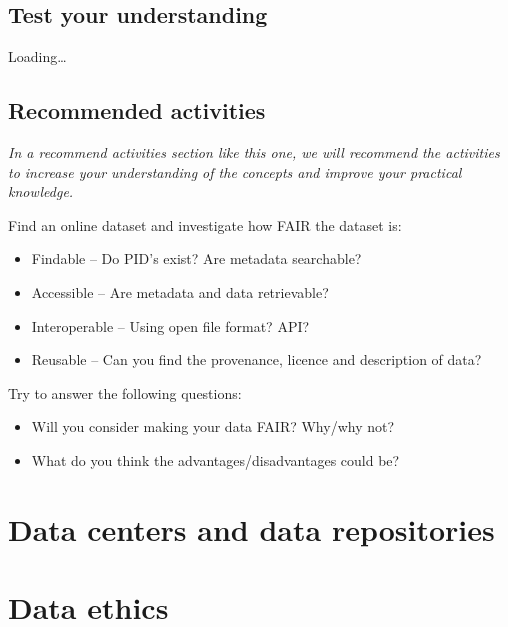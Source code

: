 \documentclass[
]{book}
\providecommand{\tightlist}{%
  \setlength{\itemsep}{0pt}\setlength{\parskip}{0pt}}
\begin{document}
\hypertarget{test-your-understanding}{%
\section{Test your understanding}\label{test-your-understanding}}

Loading\ldots{}

\hypertarget{recommended-activities}{%
\section{Recommended activities}\label{recommended-activities}}

\leavevmode{}%
\emph{In a recommend activities section like this one, we will recommend the activities to increase your understanding of the concepts and improve your practical knowledge.}

Find an online dataset and investigate how FAIR the dataset is:

\begin{itemize}
\tightlist
\item
  Findable -- Do PID's exist? Are metadata searchable?
\item
  Accessible -- Are metadata and data retrievable?
\item
  Interoperable -- Using open file format? API?
\item
  Reusable -- Can you find the provenance, licence and description of data?
\end{itemize}

Try to answer the following questions:

\begin{itemize}
\tightlist
\item
  Will you consider making your data FAIR? Why/why not?
\item
  What do you think the advantages/disadvantages could be?
\end{itemize}

\hypertarget{data-centers-and-data-repositories}{%
\chapter{Data centers and data repositories}\label{data-centers-and-data-repositories}}

\hypertarget{data-ethics}{%
\chapter{Data ethics}\label{data-ethics}}
\end{document}
